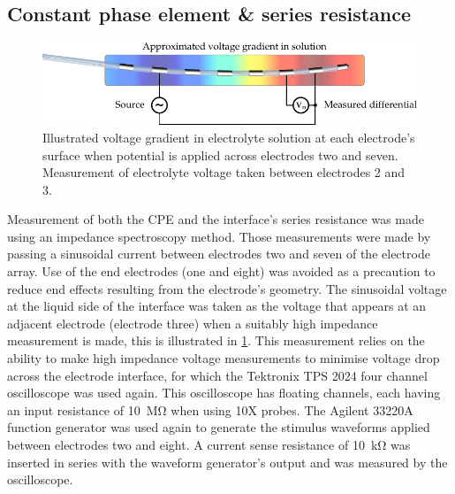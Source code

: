 

    \subsection{Constant phase element \& series resistance}


      \begin{figure}
        \centering
        \includegraphics{content/pt2/08-InterfaceParameters/graphics/measurement_CPE}
        \caption{\label{fig:pt2-measurement_CPE}Illustrated voltage gradient in electrolyte solution at each electrode's surface when potential is applied across electrodes two and seven. Measurement of electrolyte voltage taken between electrodes 2 and 3.}
      \end{figure}
      Measurement of both the CPE and the interface's series resistance was made using an impedance spectroscopy method.
      Those measurements were made by passing a sinusoidal current between electrodes two and seven of the electrode array.
      Use of the end electrodes (one and eight) was avoided as a precaution to reduce end effects resulting from the electrode's geometry.
      The sinusoidal voltage at the liquid side of the interface was taken as the voltage that appears at an adjacent electrode (electrode three) when a suitably high impedance measurement is made, this is illustrated in \cref{fig:pt2-measurement_CPE}.
      This measurement relies on the ability to make high impedance voltage measurements to minimise voltage drop across the electrode interface, for which the Tektronix TPS 2024 four channel oscilloscope was used again.
      This oscilloscope has floating channels, each having an input resistance of \SI{10}{\mega\ohm} when using 10X probes.
      The Agilent 33220A function generator was used again to generate the stimulus waveforms applied between electrodes two and eight.
      A current sense resistance of \SI{10}{\kilo\ohm} was inserted in series with the waveform generator's output and was measured by the oscilloscope.
